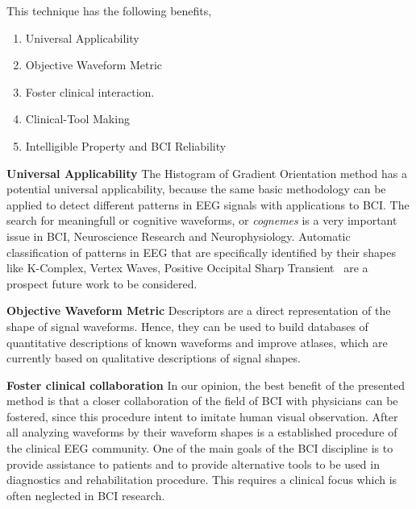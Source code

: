 

\vspace{5pt}

This technique has the following benefits,

\begin{enumerate}
\item Universal Applicability
\item Objective Waveform Metric
\item Foster clinical interaction.
\item Clinical-Tool Making
\item Intelligible Property and BCI Reliability
\end{enumerate}

\textbf{Universal Applicability}
The Histogram of Gradient Orientation method has a potential universal applicability, because the same basic methodology can be applied to detect different patterns in EEG signals with applications to BCI.   The search for meaningfull or cognitive waveforms, or \textit{cognemes} is a very important issue in BCI, Neuroscience Research and Neurophysiology. Automatic classification of patterns in EEG that are specifically identified by their shapes like K-Complex, Vertex Waves, Positive Occipital Sharp Transient~\cite{Hartman2005} are a prospect future work to be considered. 


\textbf{Objective Waveform Metric}
Descriptors are a direct representation of the shape of signal waveforms. Hence,  they can be used to build databases of quantitative descriptions of known waveforms and improve atlases, which are currently based on qualitative descriptions of signal shapes.

\textbf{Foster clinical collaboration}
In our opinion, the best benefit of the presented method is that a closer collaboration of the field of BCI with physicians can be fostered, since this procedure intent to imitate human visual observation. After all analyzing waveforms by their waveform shapes is a established procedure of the clinical EEG community. One of the main goals of the BCI discipline is to provide assistance to patients and to provide alternative tools to be used in diagnostics and rehabilitation procedure.  This requires a clinical focus which is often neglected in BCI research. 

